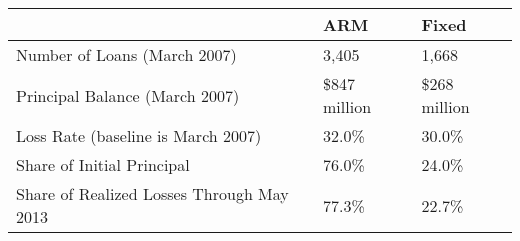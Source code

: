 \begin{tabular}{| l | l | l |}
\hline
  & \textbf{ARM} & \textbf{Fixed} \\
\hline
Number of Loans (March 2007) & 3,405 & 1,668 \\
Principal Balance (March 2007) & \$847 million & \$268 million \\
Loss Rate (baseline is March 2007) & 32.0\% & 30.0\% \\
Share of Initial Principal & 76.0\% & 24.0\% \\
Share of Realized Losses Through May 2013 & 77.3\% & 22.7\% \\
\hline
\end{tabular}